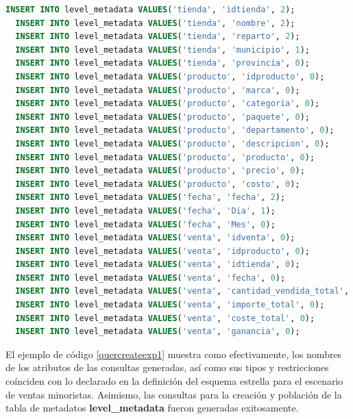\begin{lstlisting}[label={quercreateexp1}, caption={Consultas de creaci\'on generadas para el experimento 1}, language={sql}]
  INSERT INTO level_metadata VALUES('tienda', 'idtienda', 2);
  INSERT INTO level_metadata VALUES('tienda', 'nombre', 2);
  INSERT INTO level_metadata VALUES('tienda', 'reparto', 2);
  INSERT INTO level_metadata VALUES('tienda', 'municipio', 1);
  INSERT INTO level_metadata VALUES('tienda', 'provincia', 0);
  INSERT INTO level_metadata VALUES('producto', 'idproducto', 0);
  INSERT INTO level_metadata VALUES('producto', 'marca', 0);
  INSERT INTO level_metadata VALUES('producto', 'categoria', 0);
  INSERT INTO level_metadata VALUES('producto', 'paquete', 0);
  INSERT INTO level_metadata VALUES('producto', 'departamento', 0);
  INSERT INTO level_metadata VALUES('producto', 'descripcion', 0);
  INSERT INTO level_metadata VALUES('producto', 'producto', 0);
  INSERT INTO level_metadata VALUES('producto', 'precio', 0);
  INSERT INTO level_metadata VALUES('producto', 'costo', 0);
  INSERT INTO level_metadata VALUES('fecha', 'fecha', 2);
  INSERT INTO level_metadata VALUES('fecha', 'Dia', 1);
  INSERT INTO level_metadata VALUES('fecha', 'Mes', 0);
  INSERT INTO level_metadata VALUES('venta', 'idventa', 0);
  INSERT INTO level_metadata VALUES('venta', 'idproducto', 0);
  INSERT INTO level_metadata VALUES('venta', 'idtienda', 0);
  INSERT INTO level_metadata VALUES('venta', 'fecha', 0);
  INSERT INTO level_metadata VALUES('venta', 'cantidad_vendida_total', 0);
  INSERT INTO level_metadata VALUES('venta', 'importe_total', 0);
  INSERT INTO level_metadata VALUES('venta', 'coste_total', 0);
  INSERT INTO level_metadata VALUES('venta', 'ganancia', 0);
\end{lstlisting}

El ejemplo de c\'odigo \ref{quercreateexp1} muestra como efectivamente, los nombres de los atributos 
de las consultas generadas, as\'i como sus tipos y restricciones co\'inciden con lo declarado en la definición 
del esquema estrella para el escenario de ventas minoristas. Asimismo, las consultas para la creación y 
población de la tabla de metadatos \textbf{level\_metadata} fueron generadas exitosamente.

